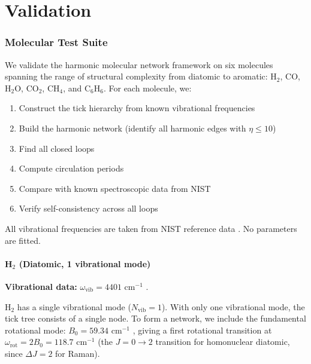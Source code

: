\documentclass[11pt,a4paper]{article}
\theoremstyle{definition}
\theoremstyle{remark}
\begin{document}

\part{Validation}

\section{Molecular Test Suite}
\label{sec:validation}

We validate the harmonic molecular network framework on six molecules spanning the range of structural complexity from diatomic to aromatic: H$_2$, CO, H$_2$O, CO$_2$, CH$_4$, and C$_6$H$_6$. For each molecule, we:
\begin{enumerate}[nosep]
\item Construct the tick hierarchy from known vibrational frequencies
\item Build the harmonic network (identify all harmonic edges with $\eta \leq 10$)
\item Find all closed loops
\item Compute circulation periods
\item Compare with known spectroscopic data from NIST \citep{nist_webbook, shimanouchi1972}
\item Verify self-consistency across all loops
\end{enumerate}

All vibrational frequencies are taken from NIST reference data \citep{shimanouchi1972, nist_webbook, huber1979, irikura2007}. No parameters are fitted.

\subsection{H$_2$ (Diatomic, 1 vibrational mode)}

\textbf{Vibrational data:} $\omega_{\mathrm{vib}} = 4401$ cm$^{-1}$ \citep{huber1979}.

H$_2$ has a single vibrational mode ($N_{\mathrm{vib}} = 1$). With only one vibrational mode, the tick tree consists of a single node. To form a network, we include the fundamental rotational mode: $B_0 = 59.34$ cm$^{-1}$ \citep{huber1979}, giving a first rotational transition at $\omega_{\mathrm{rot}} = 2B_0 = 118.7$ cm$^{-1}$ (the $J = 0 \to 2$ transition for homonuclear diatomic, since $\Delta J = 2$ for Raman).
\end{document}
